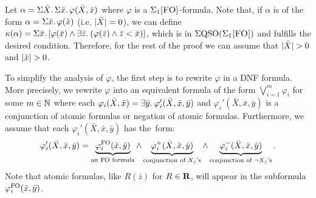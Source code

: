   Let $\alpha =  \Sigma{\bar{X}}.\,\Sigma{\bar{x}}.\, \varphi(\bar{X},\bar{x})$ where $\varphi$ is a $\Sigma_{1}\textsc{[FO]}$-formula.
Note that, if $\alpha$ is of the form $\alpha = \Sigma{\bar{x}}.\, \varphi(\bar{x})$ (i.e. $\vert \bar{X} \vert = 0$), we can define $\kappa(\alpha) = \Sigma{\bar{x}}.\, [\varphi(\bar{x})\wedge \exists{\bar{z}}.\:(\varphi(\bar{z})\wedge\bar{z} < \bar{x})]$, which is in $\Sigma{\rm QSO}(\Sigma_{1}\textsc{[FO]})$ and fulfills the desired condition. 
Therefore, for the rest of the proof we can assume that $\vert \bar{X} \vert > 0$ and $\vert \bar{x} \vert > 0$.

To simplify the analysis of $\varphi$, the first step is to rewrite $\varphi$ in a DNF formula. 
More precisely, we rewrite $\varphi$ into an equivalent formula of the form $\bigvee_{i = 1}^m \varphi_i$ for some $m\in \mathbb{N}$ where each $\varphi_i(\bar{X}, \bar{x}) = \exists{\bar{y}}.\: \varphi_i'(\bar{X}, \bar{x}, \bar{y})$ and $\varphi_i'(\bar{X}, \bar{x}, \bar{y})$ is a conjunction of atomic formulas or negation of atomic formulas. Furthermore, we assume that each $\varphi_i'(\bar{X}, \bar{x}, \bar{y})$ has the~form:
$$
\varphi_i'(\bar{X}, \bar{x}, \bar{y}) =  \underbrace{\varphi_i^{{\rm FO}}(\bar{x},\bar{y})}_{\text{an ${\rm FO}$ formula}} \wedge 
\underbrace{\varphi_i^{+}(\bar{X},\bar{x},\bar{y})}_{\text{conjunction of $X_j$'s}} \wedge
\underbrace{\varphi_i^{-}(\bar{X},\bar{x},\bar{y})}_{\text{conjunction of $\neg X_j$'s}}.
$$
Note that atomic formulas, like $R(\bar{z})$ for $R \in \mathbf{R}$, will appear in the subformula $\varphi_i^{{\rm FO}}(\bar{x},\bar{y})$. 

